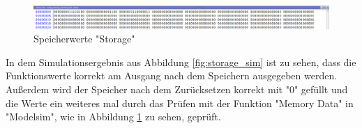 \documentclass{article}
\numberwithin{equation}{section}
\begin{document}
\FloatBarrier
\begin{figure}[htb!]
    \begin{center}
      \includegraphics[width=15cm]{SimulationPictures/storage_memory_sim.png}
    \end{center}
    \caption{Speicherwerte "Storage"} \label{fig:storage_memory_sim}
  \end{figure}
\FloatBarrier
In dem Simulationsergebnis aus Abbildung \ref{fig:storage_sim} ist zu sehen, dass die 
Funktionswerte korrekt am Ausgang nach dem Speichern ausgegeben werden. Außerdem wird 
der Speicher nach dem Zurücksetzen korrekt mit "0" gefüllt und die Werte ein weiteres
mal durch das Prüfen mit der Funktion "Memory Data" in "Modelsim", wie in Abbildung
\ref{fig:storage_memory_sim} zu sehen, geprüft.
\pagebreak
\end{document}
